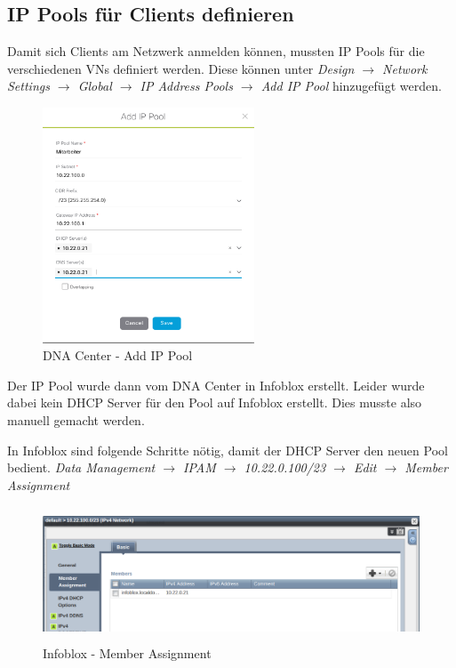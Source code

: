\subsection{IP Pools für Clients definieren}

Damit sich Clients am Netzwerk anmelden können, mussten IP Pools für die verschiedenen VNs definiert werden. Diese können unter \textit{Design $\rightarrow$ Network Settings  $\rightarrow$ Global $\rightarrow$ IP Address Pools $\rightarrow$ Add IP Pool} hinzugefügt werden.

\begin{figure}[H]
	\centering
	\includegraphics[height=7cm]{img/secondtry/dna-add-ip-pool.png}
	\caption{DNA Center - Add IP Pool}
	\label{fig:dna-center-add-ip-pool}
\end{figure}

Der IP Pool wurde dann vom DNA Center in Infoblox erstellt. Leider wurde dabei kein DHCP Server für den Pool auf Infoblox erstellt. Dies musste also manuell gemacht werden.

In Infoblox sind folgende Schritte nötig, damit der DHCP Server den neuen Pool bedient. \textit{Data Management $\rightarrow$ IPAM  $\rightarrow$ 10.22.0.100/23 $\rightarrow$ Edit $\rightarrow$ Member Assignment}

\begin{figure}[H]
	\centering
	\includegraphics[height=4cm]{img/secondtry/infoblox-add-dhcp-1.png}
	\caption{Infoblox - Member Assignment}
	\label{fig:infoblox-member-assignment}
\end{figure}

